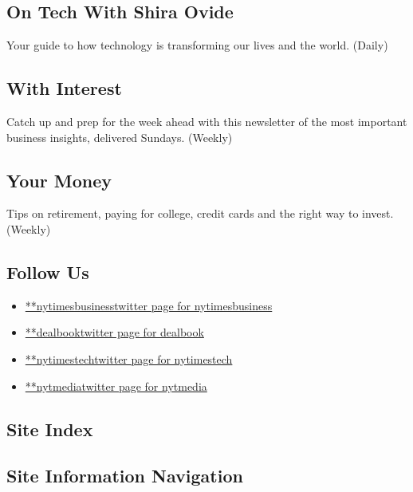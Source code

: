\hypertarget{on-tech-with-shira-ovide}{%
\subsection{On Tech With Shira Ovide}\label{on-tech-with-shira-ovide}}

Your guide to how technology is transforming our lives and the world.
(Daily)

\hypertarget{with-interest}{%
\subsection{With Interest}\label{with-interest}}

Catch up and prep for the week ahead with this newsletter of the most
important business insights, delivered Sundays. (Weekly)

\hypertarget{your-money}{%
\subsection{Your Money}\label{your-money}}

Tips on retirement, paying for college, credit cards and the right way
to invest. (Weekly)

\hypertarget{follow-us}{%
\subsection{Follow Us}\label{follow-us}}

\begin{itemize}
\tightlist
\item
  \href{https://twitter.com/nytimesbusiness}{**nytimesbusinesstwitter
  page for nytimesbusiness}
\item
  \href{https://twitter.com/dealbook}{**dealbooktwitter page for
  dealbook}
\item
  \href{https://twitter.com/nytimestech}{**nytimestechtwitter page for
  nytimestech}
\item
  \href{https://twitter.com/nytmedia}{**nytmediatwitter page for
  nytmedia}
\end{itemize}

\hypertarget{site-index}{%
\subsection{Site Index}\label{site-index}}

\hypertarget{site-information-navigation}{%
\subsection{Site Information
Navigation}\label{site-information-navigation}}

